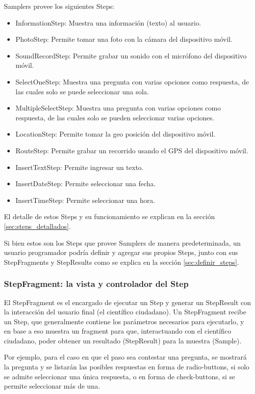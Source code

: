 Samplers provee los siguientes Steps:
\begin{itemize}
	\item InformationStep: Muestra una información (texto) al usuario.
	\item PhotoStep: Permite tomar una foto con la cámara del dispositivo móvil.
	\item SoundRecordStep: Permite grabar un sonido con el micrófono del dispositivo móvil.
	\item SelectOneStep: Muestra una pregunta con varias opciones como respuesta, de las cuales solo se puede seleccionar una sola.
	\item MultipleSelectStep: Muestra una pregunta con varias opciones como respuesta, de las cuales solo se pueden seleccionar varias opciones.
	\item LocationStep: Permite tomar la geo posición del dispositivo móvil.
	\item RouteStep: Permite grabar un recorrido usando el GPS del dispositivo móvil.
	\item InsertTextStep: Permite ingresar un texto.
	\item InsertDateStep: Permite seleccionar una fecha.
	\item InsertTimeStep: Permite seleccionar una hora.
\end{itemize}

El detalle de estos Steps y su funcionamiento se explican en la sección \ref{sec:steps_detallados}.

Si bien estos son los Steps que provee Samplers de manera predeterminada, un usuario programador podría definir y agregar sus propios Steps, junto con sus StepFragments y StepResults como se explica en la sección \ref{sec:definir_steps}.

\subsubsection{StepFragment: la vista y controlador del Step}
El StepFragment es el encargado de ejecutar un Step y generar un StepResult con la interacción del usuario final (el científico ciudadano). Un StepFragment recibe un Step, que generalmente contiene los parámetros necesarios para ejecutarlo, y en base a eso muestra un fragment para que, interactuando con el científico ciudadano, poder obtener un resultado (StepResult) para la muestra (Sample). 

Por ejemplo, para el caso en que el paso sea contestar una pregunta, se mostrará la pregunta y se listarán las posibles respuestas en forma de radio-buttons, si solo se admite seleccionar una única respuesta, o en forma de check-buttons, si se permite seleccionar más de una.

